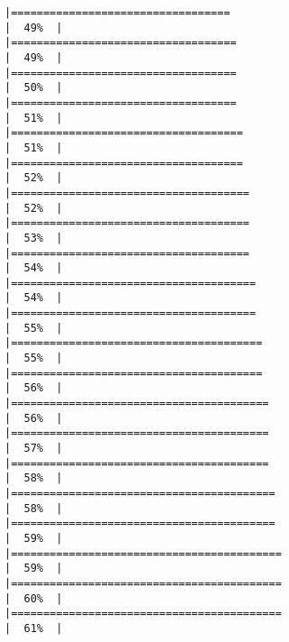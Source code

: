 \documentclass[
]{article}
\begin{document}
\begin{verbatim}
|==================================                                    |  49%  |                                                                              |===================================                                   |  49%  |                                                                              |===================================                                   |  50%  |                                                                              |===================================                                   |  51%  |                                                                              |====================================                                  |  51%  |                                                                              |====================================                                  |  52%  |                                                                              |=====================================                                 |  52%  |                                                                              |=====================================                                 |  53%  |                                                                              |=====================================                                 |  54%  |                                                                              |======================================                                |  54%  |                                                                              |======================================                                |  55%  |                                                                              |=======================================                               |  55%  |                                                                              |=======================================                               |  56%  |                                                                              |========================================                              |  56%  |                                                                              |========================================                              |  57%  |                                                                              |========================================                              |  58%  |                                                                              |=========================================                             |  58%  |                                                                              |=========================================                             |  59%  |                                                                              |==========================================                            |  59%  |                                                                              |==========================================                            |  60%  |                                                                              |==========================================                            |  61%  |                                                                              
\end{verbatim}
\end{document}
